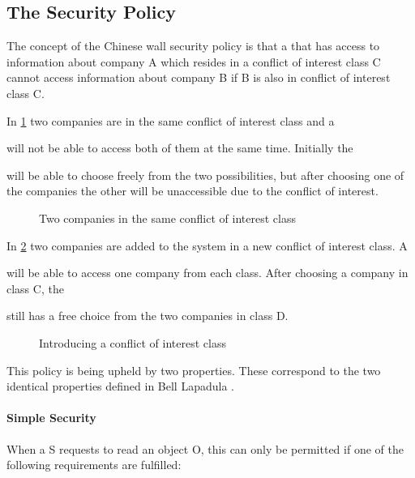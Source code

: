 \subsection{The Security Policy}
The concept of the Chinese wall security policy is that a \principal{} that has access to information about company A which resides in a conflict of interest class C cannot access information about company B if B is also in conflict of interest class C.

In \cref{china:conflict} two companies are in the same conflict of interest class and a \subject{} will not be able to access both of them at the same time.
Initially the \subject{} will be able to choose freely from the two possibilities, but after choosing one of the companies the other will be unaccessible due to the conflict of interest.

\begin{figure}[h]
  \centering
\resizebox{0.3\textwidth}{!}{  
  
  }
  \caption{Two companies in the same conflict of interest class}
  \label{china:conflict}
\end{figure}

In \cref{china:conflict2} two companies are added to the system in a new conflict of interest class.
A \subject{} will be able to access one company from each class.
After choosing a company in class C, the \subject{} still has a free choice from the two companies in class D.

\begin{figure}[h]
  \centering
  \resizebox{0.8\textwidth}{!}{
    
    }
  \caption{Introducing a conflict of interest class}
  \label{china:conflict2}
\end{figure}

This policy is being upheld by two properties.
These correspond to the two identical properties defined in Bell Lapadula .

\paragraph{Simple Security}

When a \principal{} S requests to read an object O, this can only be permitted if one of the following requirements are fulfilled:

